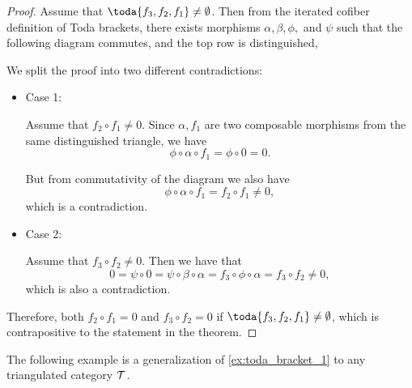 \begin{proof}
	Assume that \( \toda{f_3, f_2, f_1} \neq \emptyset \). Then from the iterated cofiber definition of Toda brackets, there exists morphisms \( \alpha, \beta, \phi, \) and \( \psi \) such that the following diagram commutes, and the top row is distinguished,
	\begin{center}
	\end{center}

	We split the proof into two different contradictions:

	\begin{itemize}
		\item{
			Case 1:

			Assume that \( f_2 \circ f_1 \neq 0 \). Since \( \alpha, f_1 \) are two composable morphisms from the same distinguished triangle, we have
			\[
				\phi \circ \alpha \circ f_1 = \phi \circ 0 = 0.
			\]

			But from commutativity of the diagram we also have
			\[
				\phi \circ \alpha \circ f_1 = f_2 \circ f_1 \neq 0,
			\]
			which is a contradiction.
		}
		\item{
			Case 2:

			Assume that \( f_3 \circ f_2 \neq 0 \). Then we have that
			\[
				0 = \psi \circ 0 = \psi \circ \beta \circ \alpha = f_3 \circ \phi \circ \alpha = f_3 \circ f_2 \neq 0,
			\]
			which is also a contradiction.
		}
	\end{itemize}

	Therefore, both \( f_2 \circ f_1 = 0 \) and \( f_3 \circ f_2 = 0 \) if \( \toda{f_3, f_2, f_1} \neq \emptyset \), which is contrapositive to the statement in the theorem.
\end{proof}

The following example is a generalization of \autoref{ex:toda_bracket_1} to any triangulated category \( {\mathcal{T}} \).

